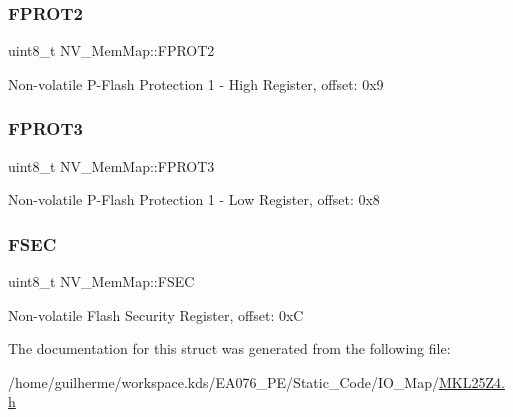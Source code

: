 \subsubsection{\texorpdfstring{F\+P\+R\+O\+T2}{FPROT2}}
{\footnotesize\ttfamily uint8\+\_\+t N\+V\+\_\+\+Mem\+Map\+::\+F\+P\+R\+O\+T2}

Non-\/volatile P-\/\+Flash Protection 1 -\/ High Register, offset\+: 0x9 \mbox{\label{struct_n_v___mem_map_a944089b14b23cff0b4f8a16e13f8b9d6}} 
\subsubsection{\texorpdfstring{F\+P\+R\+O\+T3}{FPROT3}}
{\footnotesize\ttfamily uint8\+\_\+t N\+V\+\_\+\+Mem\+Map\+::\+F\+P\+R\+O\+T3}

Non-\/volatile P-\/\+Flash Protection 1 -\/ Low Register, offset\+: 0x8 \mbox{\label{struct_n_v___mem_map_acb89fbc884fb10887ef063d1aa892b29}} 
\subsubsection{\texorpdfstring{F\+S\+EC}{FSEC}}
{\footnotesize\ttfamily uint8\+\_\+t N\+V\+\_\+\+Mem\+Map\+::\+F\+S\+EC}

Non-\/volatile Flash Security Register, offset\+: 0xC 

The documentation for this struct was generated from the following file\+:\begin{DoxyCompactItemize}
\item 
/home/guilherme/workspace.\+kds/\+E\+A076\+\_\+\+P\+E/\+Static\+\_\+\+Code/\+I\+O\+\_\+\+Map/\hyperlink{_m_k_l25_z4_8h}{M\+K\+L25\+Z4.\+h}\end{DoxyCompactItemize}

